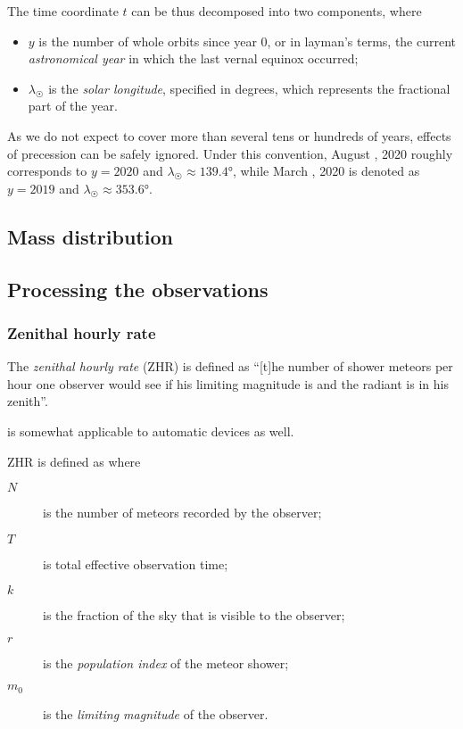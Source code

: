         The time coordinate $t$ can be thus decomposed into two components,
        where
        \begin{itemize}
            \item $y$ is the number of whole orbits since year 0, or in layman's terms,
                the current \emph{astronomical year} in which the last vernal equinox occurred;
            \item $\lambda_\Sun$ is the \emph{solar longitude}, specified in degrees, which represents the fractional part of the year.
        \end{itemize}

        As we do not expect to cover more than several tens or hundreds of years, effects of precession can be safely ignored.
        Under this convention, August , 2020 roughly corresponds to $y = 2020$ and $\lambda_\Sun \approx \ang{139.4}$,
        while March , 2020 is denoted as $y = 2019$ and $\lambda_\Sun \approx \ang{353.6}$.


        \subsection{Mass distribution} \label{}


    \subsection{Processing the observations} \label{msp}


        \subsubsection{Zenithal hourly rate} \label{ipqz}
            The \emph{zenithal hourly rate} (ZHR) is defined as ``[t]he number of shower meteors per hour
            one observer would see if his limiting magnitude is  and the radiant is in his zenith''.

            is somewhat applicable to automatic devices as well.

            ZHR is defined as
            where
            \begin{description}
                \item[$N$]      is the number of meteors recorded by the observer;
                \item[$T$]      is total effective observation time;
                \item[$k$]      is the fraction of the sky that is visible to the observer;
                \item[$r$]      is the \emph{population index} of the meteor shower;
                \item[$m_0$]    is the \emph{limiting magnitude} of the observer.
            \end{description}

